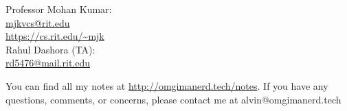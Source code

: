 \documentclass{math}
\begin{document}
\noindent Professor Mohan Kumar: \\
\url{mjkvcs@rit.edu} \\
\url{https://cs.rit.edu/~mjk} \\

\noindent Rahul Dashora (TA): \\
\url{rd5476@mail.rit.edu} \\

\begin{center}
  You can find all my notes at \url{http://omgimanerd.tech/notes}. If you have
  any questions, comments, or concerns, please contact me at
  alvin@omgimanerd.tech
\end{center}
\end{document}
